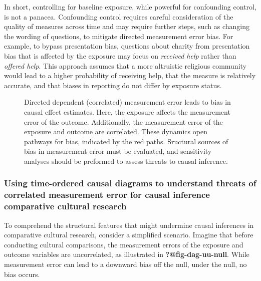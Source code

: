 \documentclass[
  singlecolumn,
  9pt]{article}
\begin{document}
In short, controlling for baseline exposure, while powerful for
confounding control, is not a panacea. Confounding control requires
careful consideration of the quality of measures across time and may
require further steps, such as changing the wording of questions, to
mitigate directed measurement error bias. For example, to bypass
presentation bias, questions about charity from presentation bias that
is affected by the exposure may focus on \emph{received help} rather
than \emph{offered help}. This approach assumes that a more altruistic
religious community would lead to a higher probability of receiving
help, that the measure is relatively accurate, and that biases in
reporting do not differ by exposure status.

\begin{figure}


\caption{\label{fig-dag-d-d}Directed dependent (correlated) measurement
error leads to bias in causal effect estimates. Here, the exposure
affects the measurement error of the outcome. Additionally, the
measurement error of the exposure and outcome are correlated. These
dynamics open pathways for bias, indicated by the red paths. Sructural
sources of bias in measurement error must be evaluated, and sensitivity
analyses should be preformed to assess threats to causal inference.}

\end{figure}%

\subsubsection{Using time-ordered causal diagrams to understand threats
of correlated measurement error for causal inference comparative
cultural
research}\label{using-time-ordered-causal-diagrams-to-understand-threats-of-correlated-measurement-error-for-causal-inference-comparative-cultural-research}

To comprehend the structural features that might undermine causal
inferences in comparative cultural research, consider a simplified
scenario. Imagine that before conducting cultural comparisons, the
measurement errors of the exposure and outcome variables are
uncorrelated, as illustrated in \textbf{?@fig-dag-uu-null}. While
measurement error can lead to a downward bias off the null, under the
null, no bias occurs.
\end{document}
